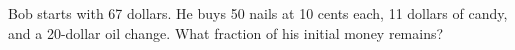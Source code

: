 Bob starts with 67 dollars. He buys 50 nails at 10 cents each, 11 dollars of candy, and a 20-dollar oil change. What fraction of his initial money remains?
